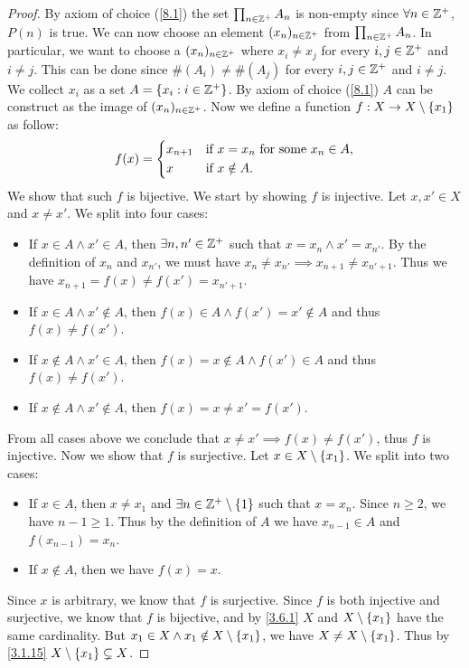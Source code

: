 \begin{proof}
	By axiom of choice (\cref{8.1}) the set \(\prod_{n \in \mathbb{Z}^+} A_n\) is non-empty since \(\forall n \in \mathbb{Z}^+\), \(P(n)\) is true.
	We can now choose an element \((x_n)_{n \in \mathbb{Z}^+}\) from \(\prod_{n \in \mathbb{Z}^+} A_n\).
	In particular, we want to choose a \((x_n)_{n \in \mathbb{Z}^+}\) where \(x_i \neq x_j\) for every \(i, j \in \mathbb{Z}^+\) and \(i \neq j\).
	This can be done since \(\#(A_i) \neq \#(A_j)\) for every \(i, j \in \mathbb{Z}^+\) and \(i \neq j\).
	We collect \(x_i\) as a set \(A = \left\lbrace x_i : i \in \mathbb{Z}^+\right\rbrace\).
	By axiom of choice (\cref{8.1}) \(A\) can be construct as the image of \((x_n)_{n \in \mathbb{Z}^+}\).
	Now we define a function \(f : X \to X \setminus \left\lbrace x_1\right\rbrace\) as follow:
	\[
		f(x) = \begin{dcases}
			x_{n + 1} & \text{if } x = x_n \text{ for some } x_n \in A, \\
			x         & \text{if } x \notin A.
		\end{dcases}
	\]
	We show that such \(f\) is bijective.
	We start by showing \(f\) is injective.
	Let \(x, x' \in X\) and \(x \neq x'\).
	We split into four cases:
	\begin{itemize}
		\item If \(x \in A \land x' \in A\), then \(\exists n, n' \in \mathbb{Z}^+\) such that \(x = x_n \land x' = x_{n'}\).
		      By the definition of \(x_n\) and \(x_{n'}\), we must have \(x_n \neq x_{n'} \implies x_{n + 1} \neq x_{n' + 1}\).
		      Thus we have \(x_{n + 1} = f(x) \neq f(x') = x_{n' + 1}\).
		\item If \(x \in A \land x' \notin A\), then \(f(x) \in A \land f(x') = x' \notin A\) and thus \(f(x) \neq f(x')\).
		\item If \(x \notin A \land x' \in A\), then \(f(x) = x \notin A \land f(x') \in A\) and thus \(f(x) \neq f(x')\).
		\item If \(x \notin A \land x' \notin A\), then \(f(x) = x \neq x' = f(x')\).
	\end{itemize}
	From all cases above we conclude that \(x \neq x' \implies f(x) \neq f(x')\), thus \(f\) is injective.
	Now we show that \(f\) is surjective.
	Let \(x \in X \setminus \left\lbrace x_1\right\rbrace\).
	We split into two cases:
	\begin{itemize}
		\item If \(x \in A\), then \(x \neq x_1\) and \(\exists n \in \mathbb{Z}^+ \setminus \left\lbrace1\right\rbrace\) such that \(x = x_n\).
		      Since \(n \geq 2\), we have \(n - 1 \geq 1\).
		      Thus by the definition of \(A\) we have \(x_{n - 1} \in A\) and \(f(x_{n - 1}) = x_n\).
		\item If \(x \notin A\), then we have \(f(x) = x\).
	\end{itemize}
	Since \(x\) is arbitrary, we know that \(f\) is surjective.
	Since \(f\) is both injective and surjective, we know that \(f\) is bijective, and by \cref{3.6.1} \(X\) and \(X \setminus \left\lbrace x_1\right\rbrace\) have the same cardinality.
	But \(x_1 \in X \land x_1 \notin X \setminus \left\lbrace x_1\right\rbrace\), we have \(X \neq X \setminus \left\lbrace x_1\right\rbrace\).
	Thus by \cref{3.1.15} \(X \setminus \left\lbrace x_1\right\rbrace \subsetneq X\).


\end{proof}
